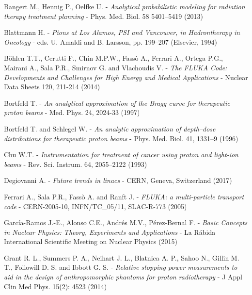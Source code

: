 \documentclass[12pt, a4paper, twoside]{book}
\begin{document}

\listoffigures
\listoftables

\begin{thebibliography}{99}

Bangert M., Hennig P., Oelfke U. -
\emph{Analytical probabilistic modeling for radiation therapy treatment planning} - 
Phys. Med. Biol. 58 5401–5419 (2013)

Blattmann H. - 
\emph{Pions at Los Alamos, PSI and Vancouver, in Hadrontherapy in Oncology} -
eds. U. Amaldi and B. Larsson, pp. 199–207 (Elsevier, 1994)


Böhlen T.T., Cerutti F., Chin M.P.W., Fassò A., Ferrari  A., Ortega P.G., Mairani A., Sala P.R., Smirnov G. and Vlachoudis V. -
\emph{The FLUKA Code: Developments and Challenges for High Energy and Medical Applications} -
Nuclear Data Sheets 120, 211-214 (2014) 

Bortfeld T. -
\emph{An analytical approximation of the Bragg curve for therapeutic proton beams} -
Med. Phys. 24, 2024-33 (1997)

Bortfeld T. and Schlegel W. -
\emph{An analytic approximation of depth–dose distributions for therapeutic proton beams} -
Phys. Med. Biol. 41, 1331–9 (1996)

Chu W.T. - 
\emph{Instrumentation for treatment of cancer using proton and light-ion beams} -
Rev. Sci. Instrum. 64, 2055–2122 (1993)

Degiovanni A. -
\emph{Future trends in linacs} - 
CERN, Geneva, Switzerland (2017)

Ferrari A., Sala P.R., Fassò A. and Ranft J. -
\emph{FLUKA: a multi-particle transport code} -
CERN-2005-10, INFN/TC\_05/11, SLAC-R-773 (2005)

García-Ramos J.-E., Alonso C.E., Andrés M.V., Pérez-Bernal F. -
\emph{Basic Concepts in Nuclear Physics: Theory, Experiments and Applications} -
La Rábida International Scientific Meeting on Nuclear Physics (2015)

Grant R. L., Summers P. A., Neihart J. L., Blatnica A. P., Sahoo N., Gillin M. T., Followill D. S. and Ibbott G. S. -
\emph{Relative stopping power measurements to aid in the design of anthropomorphic phantoms for proton radiotherapy} -
J Appl Clin Med Phys. 15(2): 4523 (2014)


\end{thebibliography}
\end{document}

